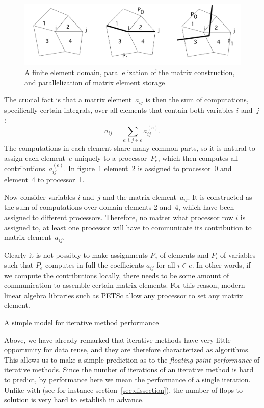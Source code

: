 \begin{figure}[ht]
  \includegraphics[scale=.12]{graphics/fem}  
  \caption{A finite element domain, parallelization of the matrix
    construction, and parallelization of matrix element storage}
  \label{fig:fem-assembly}
\end{figure}

The crucial fact is that a matrix element~$a_{ij}$ is then the sum of
computations, specifically certain integrals, over all elements that
contain both variables $i$ and~$j$:
\[ a_{ij}=\sum_{e\colon i,j\in e} a^{(e)}_{ij}. \]
The computations in each element share many common parts, so it is
natural to assign each element~$e$ uniquely to a processor~$P_e$,
which then computes all contributions~$a^{(e)}_{ij}$. In
figure~\ref{fig:fem-assembly} element~2 is assigned to processor~0
and element~4 to processor~1.

Now consider variables $i$ and~$j$ and the matrix
element~$a_{ij}$.  It is constructed as the sum of computations over
domain elements 2 and~4, which have been assigned to different processors.
Therefore, no matter what processor row $i$ is assigned to, at least
one processor will have to communicate its contribution to matrix
element~$a_{ij}$.

Clearly it is not possibly to make assignments $P_e$ of elements and
$P_i$ of variables such that $P_e$ computes in full the coefficients
$a_{ij}$ for all $i\in e$. In other words, if we compute the
contributions locally, there needs to be some amount of communication to
assemble certain matrix elements.
For this reason, modern linear algebra libraries such as PETSc
allow any processor to set any
matrix element.

 {A simple model for iterative method performance}

Above, we have already remarked that iterative methods have very little
opportunity for data reuse, and they are therefore characterized as
 algorithms. This allows us to make a simple
prediction as to the
\emph{floating point performance}%
of iterative methods.
Since the number of iterations of an iterative method is hard to predict,
by performance here we mean the performance of a single iteration.
Unlike with 
(see for instance section~\ref{sec:dissection}),
the number of flops to solution is very hard to establish in advance.

